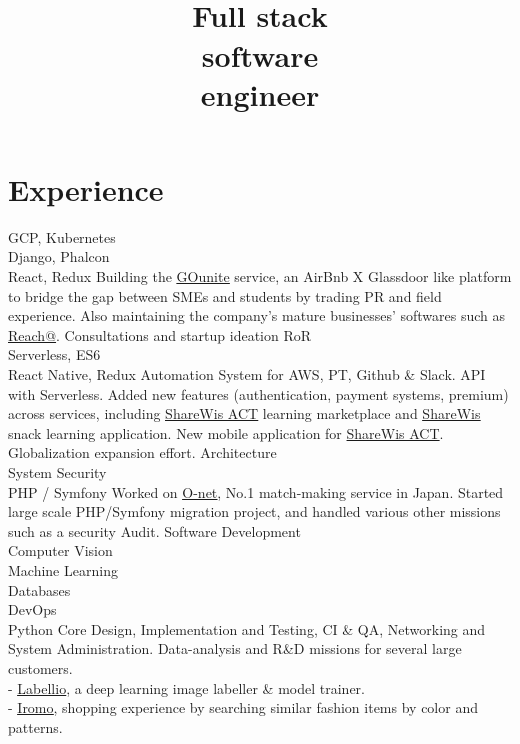 \documentclass[a4paper,11pt]{cv4tw}%
\title{\\ Full stack\\software\\engineer}
\begin{document}
\section{Experience}
{GCP, Kubernetes\\Django, Phalcon\\React, Redux}
{Building the \underline{\href{https://www.gounite.com/}{GOunite}} service, an
AirBnb X Glassdoor like platform to bridge the gap between SMEs and students
by trading PR and field experience.
Also maintaining the company's mature businesses' softwares such as
\underline{\href{http://www.reachat.jp/}{Reach@}}.
}
{}
{Consultations and startup ideation}
{RoR\\Serverless, ES6\\React Native, Redux}
{Automation System for AWS, PT, Github \& Slack. API with Serverless. Added
new features (authentication, payment systems, premium) across services,
including \underline{\href{https://act.share-wis.com}{ShareWis ACT}} learning
marketplace and \underline{\href{https://www.share-wis.com}{ShareWis}} snack
learning application.
New mobile application for \href{https://act.share-wis.com}{ShareWis ACT}.
Globalization expansion effort.
}
{Architecture\\System Security\\PHP / Symfony}
{Worked on \underline{\href{http://onet.rakuten.co.jp/}{O-net}}, No.1
  match-making service in Japan. Started large scale PHP/Symfony migration
  project, and handled various other missions such as a security Audit.
}
{Software Development\\Computer Vision\\Machine Learning\\Databases\\DevOps\\Python}
{Core Design, Implementation and Testing, CI \& QA, Networking and System Administration.
Data-analysis and R\&D missions for several large customers.\\
- \underline{\href{http://www.labell.io/}{Labellio}}, a deep
    learning image labeller \& model trainer.\\
- \underline{\href{http://iromo.jp}{Iromo}}, shopping experience by
    searching similar fashion items by color and patterns.
}
\end{document}
